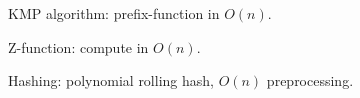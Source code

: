KMP algorithm: prefix-function in $O(n)$.

Z-function: compute in $O(n)$.

Hashing: polynomial rolling hash, $O(n)$ preprocessing.